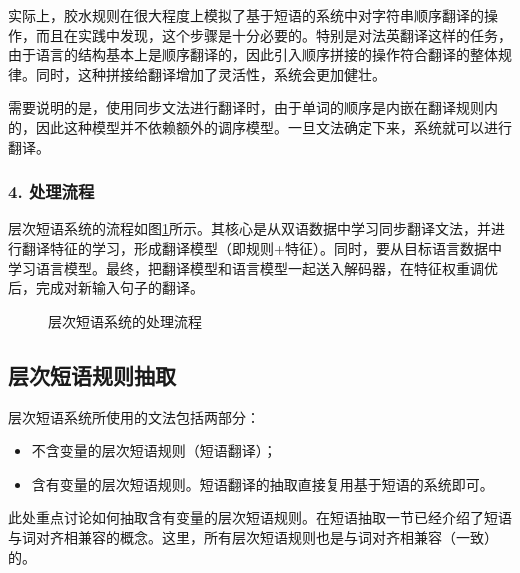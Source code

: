\parinterval 实际上，胶水规则在很大程度上模拟了基于短语的系统中对字符串顺序翻译的操作，而且在实践中发现，这个步骤是十分必要的。特别是对法英翻译这样的任务，由于语言的结构基本上是顺序翻译的，因此引入顺序拼接的操作符合翻译的整体规律。同时，这种拼接给翻译增加了灵活性，系统会更加健壮。

\parinterval 需要说明的是，使用同步文法进行翻译时，由于单词的顺序是内嵌在翻译规则内的，因此这种模型并不依赖额外的调序模型。一旦文法确定下来，系统就可以进行翻译。


\subsubsection{4. 处理流程}

\parinterval 层次短语系统的流程如图\ref{fig:8-6}所示。其核心是从双语数据中学习同步翻译文法，并进行翻译特征的学习，形成翻译模型（即规则+特征）。同时，要从目标语言数据中学习语言模型。最终，把翻译模型和语言模型一起送入解码器，在特征权重调优后，完成对新输入句子的翻译。

\begin{figure}[htp]
\centering

\caption{层次短语系统的处理流程}
\label{fig:8-6}
\end{figure}


\subsection{层次短语规则抽取}

\parinterval 层次短语系统所使用的文法包括两部分：
\begin{itemize}
\vspace{0.5em}
\item 不含变量的层次短语规则（短语翻译）；
\vspace{0.5em}
\item 含有变量的层次短语规则。短语翻译的抽取直接复用基于短语的系统即可。
\vspace{0.5em}
\end{itemize}
\parinterval 此处重点讨论如何抽取含有变量的层次短语规则。在{\chapterseven}短语抽取一节已经介绍了短语与词对齐相兼容的概念。这里，所有层次短语规则也是与词对齐相兼容（一致）的。

